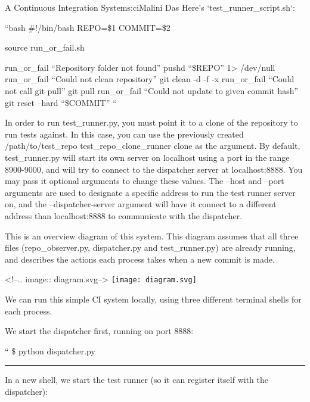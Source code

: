 \begin{aosachapter}{A Continuous Integration System}{s:ci}{Malini Das}
Here's `test\_runner\_script.sh`:

``bash \#!/bin/bash REPO=\$1 COMMIT=\$2

source run\_or\_fail.sh

run\_or\_fail ``Repository folder not found'' pushd ``\$REPO''
1\textgreater{} /dev/null run\_or\_fail ``Could not clean repository''
git clean -d -f -x run\_or\_fail ``Could not call git pull'' git pull
run\_or\_fail ``Could not update to given commit hash'' git reset --hard
``\$COMMIT'' ``

In order to run test\_runner.py, you must point it to a clone of the
repository to run tests against. In this case, you can use the
previously created /path/to/test\_repo test\_repo\_clone\_runner clone
as the argument. By default, test\_runner.py will start its own server
on localhost using a port in the range 8900-9000, and will try to
connect to the dispatcher server at localhost:8888. You may pass it
optional arguments to change these values. The --host and --port
arguments are used to designate a specific address to run the test
runner server on, and the --dispatcher-server argument will have it
connect to a different address than localhost:8888 to communicate with
the dispatcher.

\label{control-flow-diagram}

This is an overview diagram of this system. This diagram assumes that
all three files (repo\_observer.py, dispatcher.py and test\_runner.py)
are already running, and describes the actions each process takes when a
new commit is made.

\textless{}!--.. image:: diagram.svg--\textgreater{}
\texttt{[image: diagram.svg]}

\label{running-the-code}

We can run this simple CI system locally, using three different terminal
shells for each process.

We start the dispatcher first, running on port 8888:

\begin{aosadescription}

\item[``]
\$ python dispatcher.py
\end{aosadescription}

\begin{center}\rule{3in}{0.4pt}\end{center}

In a new shell, we start the test runner (so it can register itself with
the dispatcher):


\end{aosachapter}
